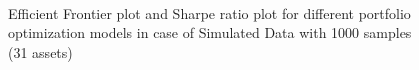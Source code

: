 \begin{figure}[!h]
    
     \hfill
   \\
   \caption{Efficient Frontier plot and Sharpe ratio plot for different portfolio optimization models in case of Simulated Data with 1000 samples (31 assets)}
   \label{fig:1}
\end{figure}

